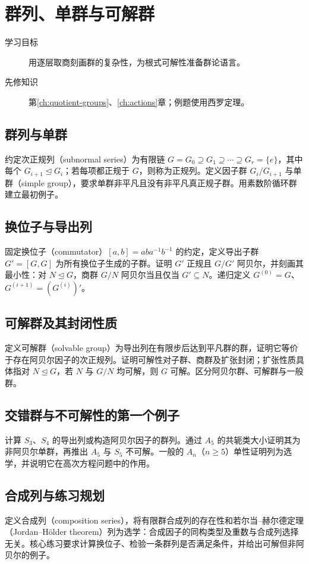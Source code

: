 \setcounter{chapter}{8} %
\chapter{群列、单群与可解群}\label{ch:solvable-groups}

\begin{description}
  \item[学习目标] 用逐层取商刻画群的复杂性，为根式可解性准备群论语言。
  \item[先修知识] 第\ref{ch:quotient-groups}、\ref{ch:actions}章；例题使用西罗定理。
\end{description}

\section{群列与单群}
约定次正规列（subnormal series）为有限链 $G=G_0\supseteq G_1\supseteq\cdots\supseteq G_r=\{e\}$，其中每个 $G_{i+1}\trianglelefteq G_i$；若每项都正规于 $G$，则称为正规列。定义因子群 $G_i/G_{i+1}$ 与单群（simple group），要求单群非平凡且没有非平凡真正规子群。用素数阶循环群建立最初例子。

\section{换位子与导出列}
固定换位子（commutator）$[a,b]=aba^{-1}b^{-1}$ 的约定，定义导出子群 $G'=[G,G]$ 为所有换位子生成的子群。证明 $G'$ 正规且 $G/G'$ 阿贝尔，并刻画其最小性：对 $N\trianglelefteq G$，商群 $G/N$ 阿贝尔当且仅当 $G'\subseteq N$。递归定义 $G^{(0)}=G$、$G^{(i+1)}=(G^{(i)})'$。

\section{可解群及其封闭性质}
定义可解群（solvable group）为导出列在有限步后达到平凡群的群，证明它等价于存在阿贝尔因子的次正规列。证明可解性对子群、商群及扩张封闭；扩张性质具体指对 $N\trianglelefteq G$，若 $N$ 与 $G/N$ 均可解，则 $G$ 可解。区分阿贝尔群、可解群与一般群。

\section{交错群与不可解性的第一个例子}
计算 $S_3$、$S_4$ 的导出列或构造阿贝尔因子的群列。通过 $A_5$ 的共轭类大小证明其为非阿贝尔单群，再推出 $A_5$ 与 $S_5$ 不可解。一般的 $A_n$（$n\geq5$）单性证明列为选学，并说明它在高次方程问题中的作用。

\section{合成列与练习规划}
定义合成列（composition series），将有限群合成列的存在性和若尔当--赫尔德定理（Jordan--Hölder theorem）列为选学：合成因子的同构类型及重数与合成列选择无关。核心练习要求计算换位子、检验一条群列是否满足条件，并给出可解但非阿贝尔的例子。


